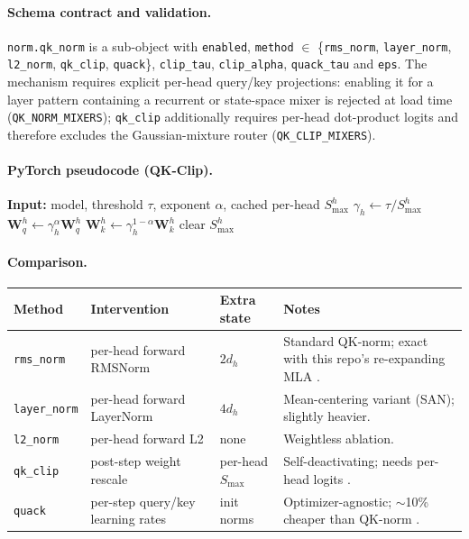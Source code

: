 \paragraph{Schema contract and validation.}
\texttt{norm.qk\_norm} is a sub-object with \texttt{enabled}, \texttt{method} $\in$ \{\texttt{rms\_norm}, \texttt{layer\_norm}, \texttt{l2\_norm}, \texttt{qk\_clip}, \texttt{quack}\}, \texttt{clip\_tau}, \texttt{clip\_alpha}, \texttt{quack\_tau} and \texttt{eps}. The mechanism requires explicit per-head query/key projections: enabling it for a layer pattern containing a recurrent or state-space mixer is rejected at load time (\texttt{QK\_NORM\_MIXERS}); \texttt{qk\_clip} additionally requires per-head dot-product logits and therefore excludes the Gaussian-mixture router (\texttt{QK\_CLIP\_MIXERS}).

\paragraph{PyTorch pseudocode (QK-Clip).}
\begin{algorithmic}[1]
\State \textbf{Input:} model, threshold $\tau$, exponent $\alpha$, cached per-head $S^h_{\max}$
    \State $\gamma_h\gets\tau/S^h_{\max}$
    \State $\mathbf{W}^h_q\gets\gamma_h^{\alpha}\mathbf{W}^h_q$ 
    \State $\mathbf{W}^h_k\gets\gamma_h^{1-\alpha}\mathbf{W}^h_k$ 
\EndFor
\State clear $S^h_{\max}$ 
\end{algorithmic}

\paragraph{Comparison.}
\scriptsize
\begin{longtable}{L{2.1cm}L{3.5cm}L{2.4cm}L{4.3cm}}
\toprule
\textbf{Method} & \textbf{Intervention} & \textbf{Extra state} & \textbf{Notes} \\
\midrule
\endhead
\texttt{rms\_norm} & per-head forward RMSNorm & $2d_h$ & Standard QK-norm; exact with this repo's re-expanding MLA \citep{henry2020querykey,han2026qknormed}. \\
\texttt{layer\_norm} & per-head forward LayerNorm & $4d_h$ & Mean-centering variant (SAN); slightly heavier. \\
\texttt{l2\_norm} & per-head forward L2 & none & Weightless ablation. \\
\texttt{qk\_clip} & post-step weight rescale & per-head $S_{\max}$ & Self-deactivating; needs per-head logits \citep{kimi2025k2}. \\
\texttt{quack} & per-step query/key learning rates & init norms & Optimizer-agnostic; $\sim$10\% cheaper than QK-norm \citep{anson2025controlling}. \\
\bottomrule
\end{longtable}
\normalsize

